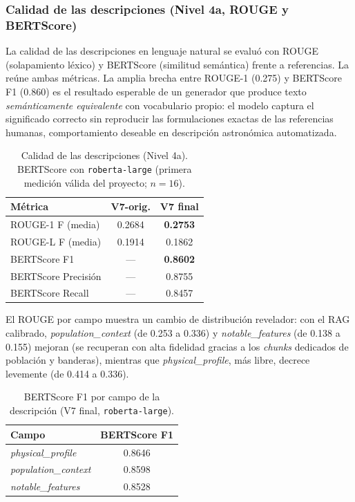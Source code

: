 \subsubsection{Calidad de las descripciones (Nivel 4a, ROUGE y BERTScore)}
\label{sec:res-l4a}

La calidad de las descripciones en lenguaje natural se evaluó con ROUGE
(solapamiento léxico) y BERTScore (similitud semántica) frente a referencias. La
 reúne ambas métricas. La amplia brecha entre ROUGE-1 (\num{0.275})
y BERTScore F1 (\num{0.860}) es el resultado esperable de un generador que produce
texto \emph{semánticamente equivalente} con vocabulario propio: el modelo captura
el significado correcto sin reproducir las formulaciones exactas de las
referencias humanas, comportamiento deseable en descripción astronómica
automatizada.

\begin{table}[H]
  \centering
  \caption{Calidad de las descripciones (Nivel 4a). BERTScore con
  \texttt{roberta-large} (primera medición válida del proyecto; $n=16$).}
  \label{tab:l4a}
  \begin{tabular}{lcc}
    \toprule
    Métrica & V7-orig. & \textbf{V7 final} \\
    \midrule
    ROUGE-1 F (media)         & 0.2684 & \textbf{0.2753} \\
    ROUGE-L F (media)         & 0.1914 & 0.1862 \\
    BERTScore F1              & ---    & \textbf{0.8602} \\
    BERTScore Precisión       & ---    & 0.8755 \\
    BERTScore Recall          & ---    & 0.8457 \\
    \bottomrule
  \end{tabular}
\end{table}

El ROUGE por campo muestra un cambio de distribución revelador: con el RAG
calibrado, \emph{population\_context} (de \num{0.253} a \num{0.336}) y
\emph{notable\_features} (de \num{0.138} a \num{0.155}) mejoran (se recuperan con
alta fidelidad gracias a los \emph{chunks} dedicados de población y banderas),
mientras que \emph{physical\_profile}, más libre, decrece levemente (de \num{0.414}
a \num{0.336}).

\begin{table}[H]
  \centering
  \caption{BERTScore F1 por campo de la descripción (V7 final,
  \texttt{roberta-large}).}
  \label{tab:l4a-field}
  \begin{tabular}{lc}
    \toprule
    Campo & BERTScore F1 \\
    \midrule
    \emph{physical\_profile}   & 0.8646 \\
    \emph{population\_context} & 0.8598 \\
    \emph{notable\_features}   & 0.8528 \\
    \bottomrule
  \end{tabular}
\end{table}

